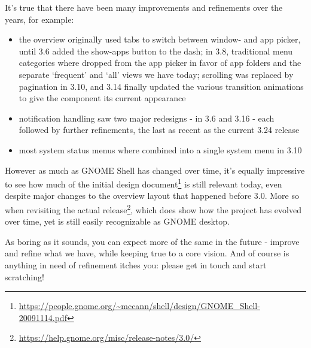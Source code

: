\documentclass[10pt, a5paper]{article}
\begin{document}
\begin{Parallel}[p]{}{}
{\a It's true that there have been many improvements and refinements over the years, for example:
\begin{itemize}
\item the overview originally used tabs to switch between window- and
   app picker, until 3.6 added the show-apps button to the dash; in
   3.8, traditional menu categories where dropped from the app picker
   in favor of app folders and the separate ‘frequent’ and ‘all’ views
   we have today; scrolling was replaced by pagination in 3.10, and 3.14
   finally updated the various transition animations to give the component
   its current appearance

\item notification handling saw two major redesigns - in 3.6 and 3.16 - each
   followed by further refinements, the last as recent as the current 3.24
   release

\item most system status menus where combined into a single system menu in 3.10
\end{itemize}

However as much as GNOME Shell has changed over time, it's equally impressive to see how much of the initial design document\footnote{\url{https://people.gnome.org/~mccann/shell/design/GNOME\_Shell-20091114.pdf}} is still relevant today, even despite major changes to the overview layout that happened before 3.0. More so when revisiting the actual release\footnote{\url{https://help.gnome.org/misc/release-notes/3.0/}}, which does show how the project has evolved over time, yet is still easily recognizable as GNOME desktop.

As boring as it sounds, you can expect more of the same in the future - improve and refine what we have, while keeping true to a core vision. And of course is anything in need of refinement itches you: please get in touch and start scratching!

\vfill
     }
\end{Parallel}
\end{document}
